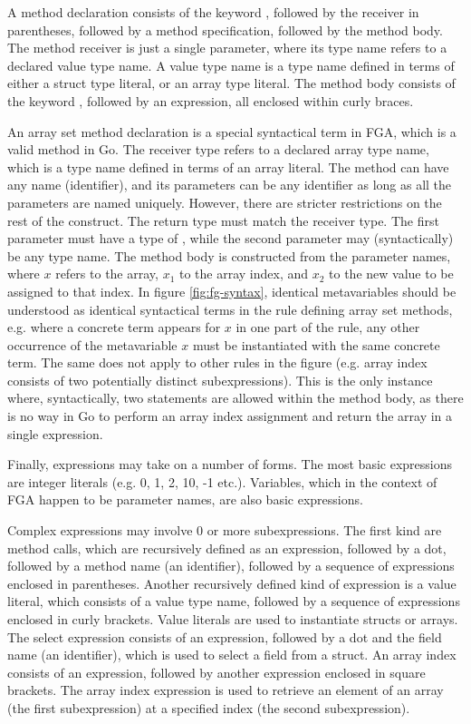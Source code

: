 A method declaration consists of the keyword \func, followed by the receiver in
parentheses, followed by a method specification, followed by the method body.
The method receiver is just a single parameter, where its type name refers to a
declared value type name. A value type name is a type name defined in terms of
either a struct type literal, or an array type literal. The method body consists
of the keyword \return, followed by an expression, all enclosed within curly
braces.

An array set method declaration is a special syntactical term in FGA, which is a
valid method in Go. The receiver type refers to a declared array type name,
which is a type name defined in terms of an array literal. The method can have
any name (identifier), and its parameters can be any identifier as long as all
the parameters are named uniquely. However, there are stricter restrictions on
the rest of the construct. The return type must match the receiver type. The
first parameter must have a type of , while the second parameter may
(syntactically) be any type name. The method body is constructed from the
parameter names, where $x$ refers to the array, $x_1$ to the array index, and
$x_2$ to the new value to be assigned to that index. In figure
\ref{fig:fg-syntax}, identical metavariables should be understood as identical
syntactical terms in the rule defining array set methods, e.g. where a concrete
term appears for $x$ in one part of the rule, any other occurrence of the
metavariable $x$ must be instantiated with the same concrete term. The same does
not apply to other rules in the figure (e.g. array index consists of two
potentially distinct subexpressions). This is the only instance where,
syntactically, two statements are allowed within the method body, as there is no
way in Go to perform an array index assignment and return the array in a single
expression.

Finally, expressions may take on a number of forms. The most basic expressions
are integer literals (e.g. 0, 1, 2, 10, -1 etc.). Variables, which in the
context of FGA happen to be parameter names, are also basic expressions.

Complex expressions may involve 0 or more subexpressions. The first kind are
method calls, which are recursively defined as an expression, followed by a dot,
followed by a method name (an identifier), followed by a sequence of expressions
enclosed in parentheses. Another recursively defined kind of expression is a
value literal, which consists of a value type name, followed by a sequence of
expressions enclosed in curly brackets. Value literals are used to instantiate
structs or arrays. The select expression consists of an expression, followed by
a dot and the field name (an identifier), which is used to select a field from a
struct. An array index consists of an expression, followed by another expression
enclosed in square brackets. The array index expression is used to retrieve an
element of an array (the first subexpression) at a specified index (the second
subexpression).

